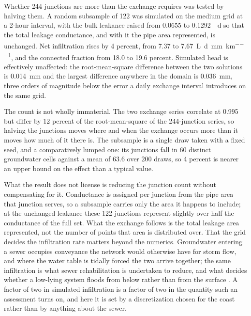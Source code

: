 \documentclass[preprint,authoryear,11pt]{elsarticle}
\begin{document}
Whether 244 junctions are more than the exchange requires was tested by halving them. A random subsample of 122 was simulated on the medium grid at a 2-hour interval, with the bulk leakance raised from 0.0655 to \SI{0.1292}{\per\day} so that the total leakage conductance, and with it the pipe area represented, is unchanged. Net infiltration rises by 4 percent, from 7.37 to \SI{7.67}{\liter\per\day\per\milli\meter\per\kilo\meter}, and the connected fraction from 18.0 to 19.6 percent. Simulated head is effectively unaffected: the root-mean-square difference between the two solutions is \SI{0.014}{\milli\meter} and the largest difference anywhere in the domain is \SI{0.036}{\milli\meter}, three orders of magnitude below the error a daily exchange interval introduces on the same grid.

The count is not wholly immaterial. The two exchange series correlate at 0.995 but differ by 12 percent of the root-mean-square of the 244-junction series, so halving the junctions moves where and when the exchange occurs more than it moves how much of it there is. The subsample is a single draw taken with a fixed seed, and a comparatively lumped one: its junctions fall in 60 distinct groundwater cells against a mean of 63.6 over 200 draws, so 4 percent is nearer an upper bound on the effect than a typical value.

What the result does not license is reducing the junction count without compensating for it. Conductance is assigned per junction from the pipe area that junction serves, so a subsample carries only the area it happens to include; at the unchanged leakance these 122 junctions represent slightly over half the conductance of the full set. What the exchange follows is the total leakage area represented, not the number of points that area is distributed over.
That the grid decides the infiltration rate matters beyond the numerics. Groundwater entering a sewer occupies conveyance the network would otherwise have for storm flow, and where the water table is tidally forced the two arrive together; the same infiltration is what sewer rehabilitation is undertaken to reduce, and what decides whether a low-lying system floods from below rather than from the surface \citep{liu2018gwsewer, su2019infiltration, liu2021predicting, su2022slr}. A factor of two in simulated infiltration is a factor of two in the quantity such an assessment turns on, and here it is set by a discretization chosen for the coast rather than by anything about the sewer.
\end{document}
